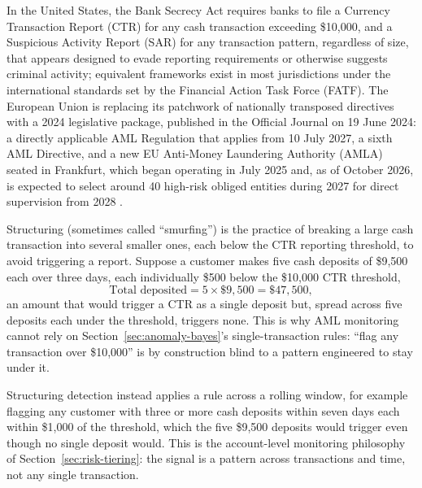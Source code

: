 \documentclass[../ai_in_finance]{subfiles}
\begin{document}
In the United States, the Bank Secrecy Act requires banks to file a Currency Transaction Report (CTR) for any cash transaction exceeding \$10,000, and a Suspicious Activity Report (SAR) for any transaction pattern, regardless of size, that appears designed to evade reporting requirements or otherwise suggests criminal activity; equivalent frameworks exist in most jurisdictions under the international standards set by the Financial Action Task Force (FATF). The European Union is replacing its patchwork of nationally transposed directives with a 2024 legislative package, published in the Official Journal on 19 June 2024: a directly applicable AML Regulation that applies from 10 July 2027, a sixth AML Directive, and a new EU Anti-Money Laundering Authority (AMLA) seated in Frankfurt, which began operating in July 2025 and, as of October 2026, is expected to select around 40 high-risk obliged entities during 2027 for direct supervision from 2028 \parencite{eu2024amlr,eu2024amla,amla2025about}.


Structuring (sometimes called ``smurfing'') is the practice of breaking a large cash transaction into several smaller ones, each below the CTR reporting threshold, to avoid triggering a report. Suppose a customer makes five cash deposits of \$9,500 each over three days, each individually \$500 below the \$10,000 CTR threshold,
\begin{equation*}
\text{Total deposited} = 5 \times \$9{,}500 = \$47{,}500,
\end{equation*}
an amount that would trigger a CTR as a single deposit but, spread across five deposits each under the threshold, triggers none. This is why AML monitoring cannot rely on Section~\ref{sec:anomaly-bayes}'s single-transaction rules: ``flag any transaction over \$10,000'' is by construction blind to a pattern engineered to stay under it.

Structuring detection instead applies a rule across a rolling window, for example flagging any customer with three or more cash deposits within seven days each within \$1,000 of the threshold, which the five \$9,500 deposits would trigger even though no single deposit would. This is the account-level monitoring philosophy of Section~\ref{sec:risk-tiering}: the signal is a pattern across transactions and time, not any single transaction.
\end{document}
